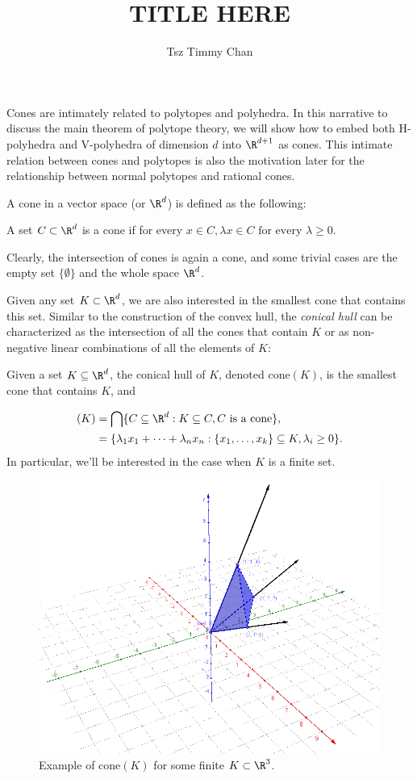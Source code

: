 \documentclass{TC}
\title{TITLE HERE}	%
\author{Tsz Timmy Chan}	%
\begin{document}
Cones are intimately related to polytopes and polyhedra. In this narrative to discuss the main theorem of polytope theory, we will show how to embed both H-polyhedra and V-polyhedra of dimension $d$ into $\R^{d+1}$ as cones. This intimate relation between cones and polytopes is also the motivation later for the relationship between normal polytopes and rational cones.

 A cone in a vector space (or $\R^d$) is defined as the following:

\begin{definition}[Cone]
A set $C \subset \R^d$ is a cone if for every $ x \in C , \lambda x \in C \text{ for every } \lambda \geq 0$.
\end{definition}

Clearly, the intersection of cones is again a cone, and some trivial cases are the empty set $\{\emptyset\}$ and the whole space $\R^d$.

Given any set $K \subset \R^d$, we are also interested in the smallest cone that contains this set. Similar to the construction of the convex hull, the \emph{conical hull} can be characterized as the intersection of all the cones that contain $K$ or as non-negative linear combinations of all the elements of $K$:

\begin{definition} Given a set $K \subseteq \R^d$, the conical hull of $K$, denoted $\mathrm{cone}(K)$, is the smallest cone that contains $K$, and 

\begin{align*}
\mathrm(K) &= \bigcap\{C \subseteq \R^d: K \subseteq C, C \text{ is a cone}\}, \\
			&= \{\lambda_1 x_1 + \cdots + \lambda_n x_n : \{ x_1,\ldots,x_k\} \subseteq K, \lambda_i \geq 0\}.
\end{align*}
In particular, we'll be interested in the case when $K$ is a finite set.
\end{definition}

\begin{figure}[h]
\centering
\includegraphics[width=.7\textwidth]{ExampleCone.png}
\caption{Example of $\mathrm{cone}(K)$ for some finite $K \subset \R^3$.}
\end{figure}
\end{document}
